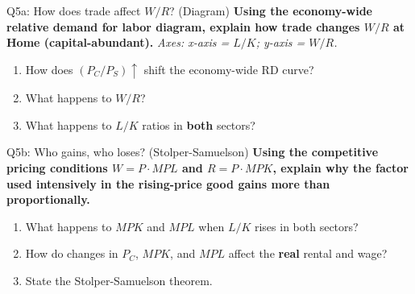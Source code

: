 \documentclass{beamer}
\begin{document}
\begin{frame}{Q5a: How does trade affect $W/R$? (Diagram)}
\textbf{Using the economy-wide relative demand for labor diagram, explain how trade changes $W/R$ at Home (capital-abundant).}
\vspace{0.2cm}
\textit{Axes: x-axis = $L/K$; \; y-axis = $W/R$.}
\vspace{0.3cm}
\begin{enumerate}
    \item How does $(P_C/P_S) \uparrow$ shift the economy-wide RD curve?
    \item What happens to $W/R$?
    \item What happens to $L/K$ ratios in \textbf{both} sectors?
\end{enumerate}
\end{frame}

\begin{frame}{Q5b: Who gains, who loses? (Stolper-Samuelson)}
\textbf{Using the competitive pricing conditions $W = P \cdot MPL$ and $R = P \cdot MPK$, explain why the factor used intensively in the rising-price good gains more than proportionally.}
\vspace{0.3cm}
\begin{enumerate}
    \item What happens to $MPK$ and $MPL$ when $L/K$ rises in both sectors?
    \item How do changes in $P_C$, $MPK$, and $MPL$ affect the \textbf{real} rental and wage?
    \item State the Stolper-Samuelson theorem.
\end{enumerate}
\end{frame}


\end{document}
